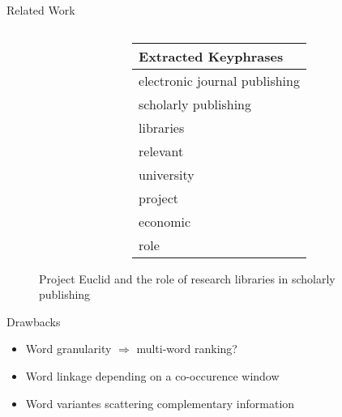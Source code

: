 \begin{frame}{Related Work}
\begin{figure}
\begin{columns}
\begin{column}{.6\textwidth}
        \end{column}
        \begin{column}{.4\textwidth}
          \footnotesize
          \begin{tabular}{l}
            Extracted Keyphrases\\
            \midrule
            electronic journal publishing\\
            \cellcolor{pink}scholarly publishing\\
            libraries\\
            relevant\\
            university\\
            project\\
            economic\\
            role
          \end{tabular}
        \end{column}
      \end{columns}
      \caption{Project Euclid and the role of research libraries in scholarly
               publishing}
    \end{figure}\vspace*{-1cm}

    \begin{block}{Drawbacks}
      \begin{itemize}
        \item{Word granularity $\Rightarrow$ multi-word ranking?}
        \item{Word linkage depending on a co-occurence window}
        \item{Word variantes scattering complementary information}
      \end{itemize}
    \end{block}
  \end{frame}

